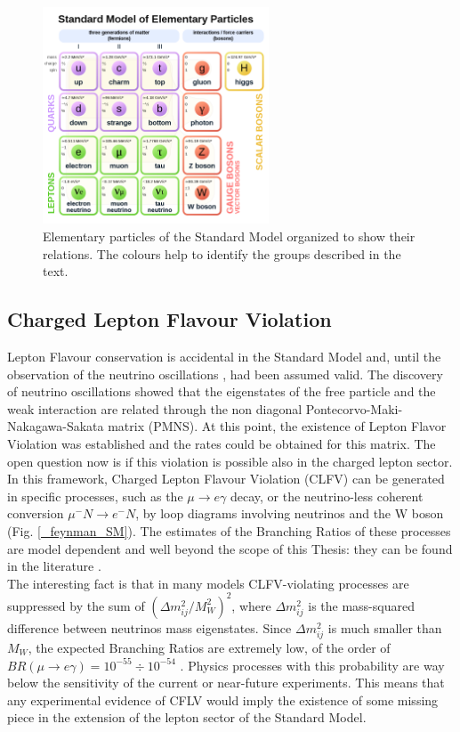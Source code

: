 \documentclass[12pt,a4paper,openright, oneside, titlepage]{book} %
\begin{document}
\begin{figure}[h!]
\centering
\includegraphics[width =0.6\textwidth, keepaspectratio]{SM}
\caption{Elementary particles of the Standard Model organized to show their relations. 
The colours help to identify the groups described in the text.}
\label{_SM}
\end{figure}

\subsection{Charged Lepton Flavour Violation}
Lepton Flavour conservation is accidental in the Standard Model and, 
until the observation of the neutrino oscillations  \cite{oscillations}, had been assumed valid. 
The discovery of neutrino oscillations showed that the eigenstates 
of the free particle and the weak  interaction are related 
through the non diagonal Pontecorvo-Maki-Nakagawa-Sakata matrix (PMNS).
At this point, the existence of  Lepton Flavor Violation was established 
and the rates could be obtained for this matrix.
The open question now is if this violation is possible also in the charged lepton sector. 
In this framework, 
Charged Lepton Flavour Violation (CLFV) can be generated in specific processes, 
such as the $\mu\rightarrow e\gamma$ decay, 
or the neutrino-less coherent conversion $\mu^-N \rightarrow e^-N$, 
by loop diagrams involving neutrinos and the W boson (Fig. \ref{_feynman_SM}).
The estimates of the Branching Ratios of these processes 
are model dependent and well beyond the scope of this Thesis: 
they can be found in the literature  \cite{signorelli}. \\
The interesting fact is that in many models 
CLFV-violating processes are suppressed 
by the sum of $(\Delta m_{ij}^2/M_W^2)^2$, 
where $\Delta m_{ij}^2$ is the mass-squared difference between neutrinos mass eigenstates. 
Since $\Delta m_{ij}^2$ is much smaller than $M_W$, 
the expected Branching Ratios are extremely low, 
of the order of $BR(\mu\rightarrow e\gamma)= 10^{-55}\div10^{-54}$ \cite {Petcov}. 
Physics processes with this probability are way below the sensitivity of the current or near-future experiments.
This means that any experimental evidence of CFLV 
would imply the existence of some missing piece 
in the extension of the lepton sector of the Standard Model.
\end{document}
